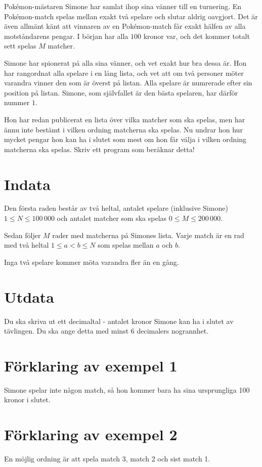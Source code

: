 Pokémon-mästaren Simone har samlat ihop sina vänner till en turnering. En
Pokémon-match spelas mellan exakt två spelare och slutar aldrig oavgjort. Det
är även allmänt känt att vinnaren av en Pokémon-match får exakt hälfen av alla
motståndarens pengar. I början har alla $100$ kronor var, och det kommer totalt
sett spelas $M$ matcher.

Simone har spionerat på alla sina vänner, och vet exakt hur bra dessa är. Hon
har rangordnat alla spelare i en lång lista, och vet att om två personer möter
varandra vinner den som är överst på listan. Alla spelare är numrerade efter
sin position på listan. Simone, som självfallet är den bästa spelaren, har
därför nummer $1$.

Hon har redan publicerat en lista över vilka matcher som ska spelas, men har
ännu inte bestämt i vilken ordning matcherna ska spelas. Nu undrar hon hur
mycket pengar hon kan ha i slutet som mest om hon får välja i vilken ordning
matcherna ska spelas. Skriv ett program som beräknar detta!

\section*{Indata}
Den första raden består av två heltal, antalet spelare (inklusive Simone) $1
\leq N \leq 100\,000$ och antalet matcher som ska spelas $0 \leq M \le
200\,000$.

Sedan följer $M$ rader med matcherna på Simones lista. Varje match är en rad
med två heltal $1 \le a < b \le N$ som spelas mellan $a$ och $b$.

Inga två spelare kommer möta varandra fler än en gång.

\section*{Utdata}
Du ska skriva ut ett decimaltal - antalet kronor Simone kan ha i slutet av
tävlingen. Du ska ange detta med minst $6$ decimalers nogrannhet.

\section*{Förklaring av exempel 1}
Simone spelar inte någon match, så hon kommer bara ha sina ursprungliga 100
kronor i slutet.

\section*{Förklaring av exempel 2}
En möjlig ordning är att spela  match 3, match 2 och sist match 1.

